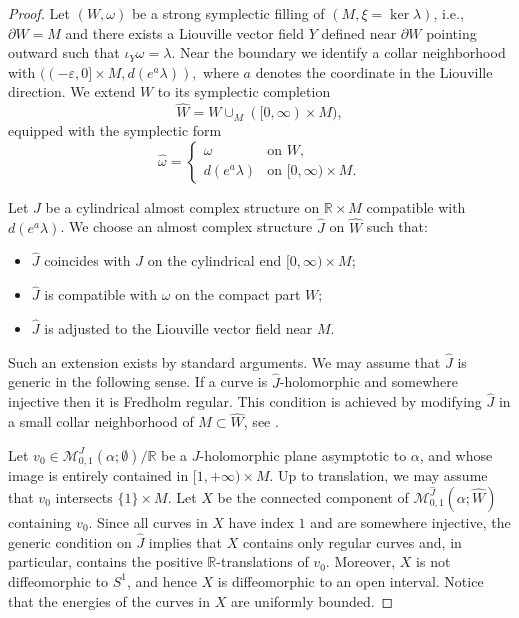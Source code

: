 \documentclass{amsart}
\newcommand{\R}{\mathbb{R}}
\newcommand{\M}{\mathcal{M}}
\begin{document}
\begin{proof} 
Let $(W,\omega)$ be a strong symplectic filling of $(M,\xi=\ker\lambda)$, i.e., $\partial W = M$ and there exists a Liouville vector field $Y$
defined near $\partial W$ pointing outward such that $\iota_Y \omega =  \lambda.$
Near the boundary we identify a collar neighborhood with
$((-\varepsilon,0]\times M, d(e^a\lambda)),$
where $a$ denotes the coordinate in the Liouville direction. We extend $W$ to its symplectic completion
$$
\widehat W
=
W \cup_{M} ([0,\infty)\times M),
$$
equipped with the symplectic form
$$
\widehat\omega =
\begin{cases}
\omega & \text{on } W, \\
d(e^a\lambda) & \text{on } [0,\infty)\times M.
\end{cases}
$$

Let $J$ be a cylindrical almost complex structure on
$\R\times M$ compatible with $d(e^a\lambda)$.
We choose an almost complex structure $\widehat J$ on $\widehat W$
such that:

\begin{itemize}
\item
$\widehat J$ coincides with $J$ on the cylindrical end
$[0,\infty)\times M$;

\item
$\widehat J$ is compatible with $\omega$ on the compact part $W$;

\item
$\widehat J$ is adjusted to the Liouville vector field near $M$.
\end{itemize}

Such an extension exists by standard arguments. We may assume that $\widehat J$ is generic in the following sense. If a curve is $\widehat J$-holomorphic and somewhere injective then it is Fredholm regular. This condition is achieved by modifying $\widehat J$ in a small collar neighborhood of $M\subset \widehat W$, see \cite[Theorem 7.2]{W16}. 
 
 
 Let $v_0\in \M_{0,1}^{J}(\alpha;\emptyset)/\R$ be a $J$-holomorphic plane asymptotic to $\alpha$, and whose image is entirely contained in $[1,+\infty) \times M$. Up to translation, we may assume that  $v_0$ intersects $\{1\}\times M$. Let $X$ be the connected component of $\M_{0,1}^{\widehat{J}}(\alpha;\widehat{W})$ containing $v_0$. Since all curves in $X$ have index $1$ and are somewhere injective, the generic condition on $\widehat J$ implies that $X$ contains only regular curves and, in particular, contains the positive $\R$-translations of $v_0$. Moreover, $X$ is not diffeomorphic to $S^1$, and hence $X$ is diffeomorphic to an open interval. Notice that the energies of the curves in $X$ are uniformly bounded. 


\end{proof}
\end{document}
